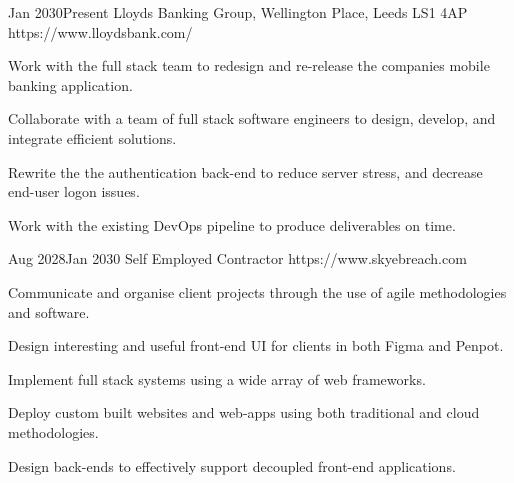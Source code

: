 


	\begin{EmploymentHistoryEntries}%
		{Jan 2030}{Present}%
		{Lloyds Banking Group, Wellington Place, Leeds LS1 4AP}%
		{https://www.lloydsbank.com/}%
		{
			\item Work with the full stack team to redesign and re-release the companies mobile banking application.
			\item Collaborate with a team of full stack software engineers to design, develop, and integrate efficient solutions.
			\item Rewrite the the authentication back-end to reduce server stress, and decrease end-user logon issues.
			\item Work with the existing DevOps pipeline to produce deliverables on time.
		}%
		{Aug 2028}{Jan 2030}%
		{Self Employed Contractor}%
		{https://www.skyebreach.com}%
		{
			\item Communicate and organise client projects through the use of agile methodologies and software.
			\item Design interesting and useful front-end UI for clients in both Figma and Penpot.
			\item Implement full stack systems using a wide array of web frameworks.
			\item Deploy custom built websites and web-apps using both traditional and cloud methodologies.
			\item Design back-ends to effectively support decoupled front-end applications.
		}%
	\end{EmploymentHistoryEntries}%

